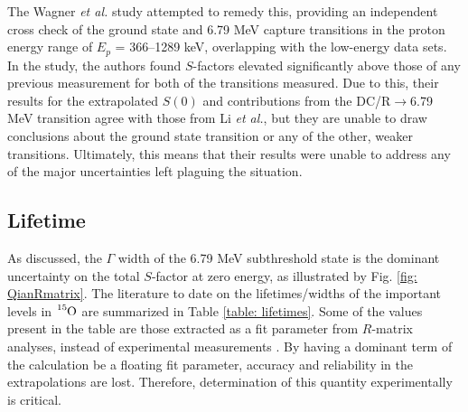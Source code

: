 The Wagner \textit{et al.} study attempted to remedy this, providing an independent cross check of the ground state and 6.79 MeV capture transitions in the proton energy range of $E_{p}$ = 366–1289 keV, overlapping with the low-energy data sets. In the study, the authors found $S$-factors elevated significantly above those of any previous measurement for both of the transitions measured. Due to this, their results for the extrapolated $S(0)$ and contributions from the DC/R$\rightarrow$6.79 MeV transition agree with those from Li \textit{et al.}, but they are unable to draw conclusions about the ground state transition or any of the other, weaker transitions. Ultimately, this means that their results were unable to address any of the major uncertainties left plaguing the situation. 



\subsection{Lifetime}


As discussed, the $\Gamma$ width of the 6.79 MeV subthreshold state is the dominant uncertainty on the total $S$-factor at zero energy, as illustrated by Fig. \ref{fig: QianRmatrix}. The literature to date on the lifetimes/widths of the important levels in $\ce{^{15}O}$ are summarized in Table \ref{table: lifetimes}. Some of the values present in the table are those extracted as a fit parameter from $R$-matrix analyses, instead of experimental measurements \cite{Schroder1987, Angulo2001, Fomicola2004, Runkle2005, Marta2008, Azuma2010, Adelberger2011}. By having a dominant term of the calculation be a floating fit parameter, accuracy and reliability in the extrapolations are lost. Therefore, determination of this quantity experimentally is critical. 


